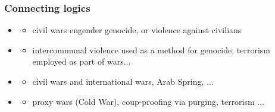 \documentclass[aspectratio=43]{beamer}
\begin{document}
\begin{frame}
\frametitle{Connecting logics}
\centering

\begin{itemize}
  \item {}
  \begin{itemize}
    \item civil wars engender genocide, or violence against civilians
  \end{itemize}
  \item<2-> 
  \begin{itemize}
    \item intercommunal violence used as a method for genocide, terrorism employed as part of wars...
  \end{itemize}
  \item<3-> 
  \begin{itemize}
    \item civil wars and international wars, Arab Spring, ...
  \end{itemize}
  \item<4-> 
  \begin{itemize}
    \item proxy wars (Cold War), coup-proofing via purging, terrorism ...
  \end{itemize}
\end{itemize}

\end{frame}





\end{document}
